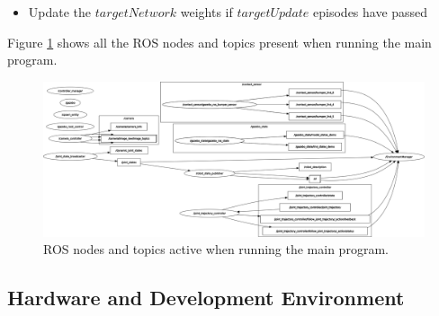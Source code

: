 \documentclass[12pt,oneside]{article}
\begin{document}
\begin{enumerate}
\begin{itemize}
\begin{itemize}
\begin{verbatim}
currentQValues = policyNetwork(states).gather(dim=1, index=actions.unsqueeze(-1))
nextQValues = targetNetwork(nextStates).max(dim=1)[0].detach()
targetQValues = nextQValues * gamma + rewards
\end{verbatim}
			\item Compute the loss using mean square error between $currentQValues$ and $targetQValues$ and apply gradient descent to update the weights in the $policyNetwork$.
\begin{verbatim}
loss = F.mse_loss(currentQValues, targetQValues.unsqueeze(1))
optimizer.zero_grad()
loss.backward()
optimizer.step()
\end{verbatim}
			\item Stop if the $environment.done$ variable is true or if the maximum number of episodes has been reached.
		\end{itemize} 
		\item Update the $targetNetwork$ weights if $targetUpdate$ episodes have passed
	\end{itemize}
\end{enumerate}
Figure \ref{fig:rosgraphlatest} shows all the ROS nodes and topics present when running the main program.
\begin{figure}[H]
\centering
\includegraphics[width=0.99\linewidth]{rosgraph_latest}
\caption{ROS nodes and topics active when running the main program.}
\label{fig:rosgraphlatest}
\end{figure}

\subsection{Hardware and Development Environment} 
\end{document}
